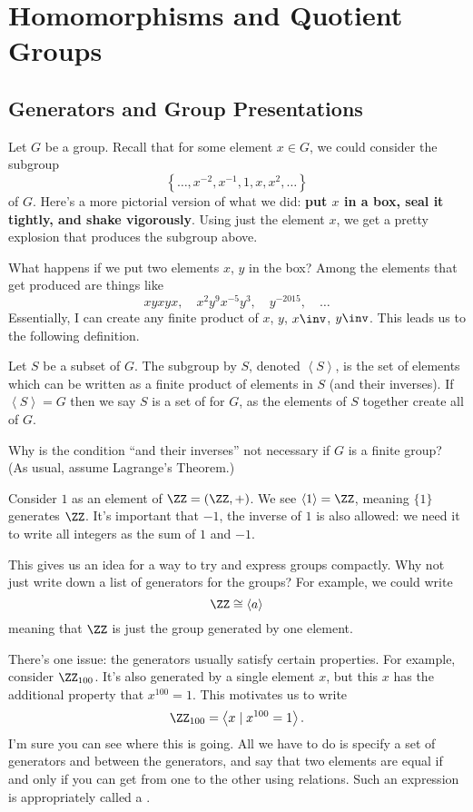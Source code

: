 \chapter{Homomorphisms and Quotient Groups}
\section{Generators and Group Presentations}
Let $G$ be a group. Recall that for some element $x \in G$, we could consider the subgroup
\[ \left\{ \dots, x^{-2}, x^{-1}, 1, x, x^2, \dots \right\} \]
of $G$.
Here's a more pictorial version of what we did: \textbf{put $x$ in a box, seal it tightly, and shake vigorously}.
Using just the element $x$, we get a pretty explosion that produces the subgroup above.

What happens if we put two elements $x$, $y$ in the box?
Among the elements that get produced are things like
\[ xyxyx, \quad x^2y^9x^{-5}y^3, \quad y^{-2015}, \quad \dots\]
Essentially, I can create any finite product of $x$, $y$, $x\inv$, $y\inv$.
This leads us to the following definition.
\begin{definition}
	Let $S$ be a subset of $G$.  The subgroup  by $S$, denoted $\left<S\right>$, is the set of elements which can be written as a finite product of elements in $S$ (and their inverses).
	If $\left<S\right> = G$ then we say $S$ is a set of  for $G$,
	as the elements of $S$ together create all of $G$.
\end{definition}
\begin{exercise}
	Why is the condition ``and their inverses''
	not necessary if $G$ is  a finite group?
	(As usual, assume Lagrange's Theorem.)
\end{exercise}

\begin{example}
	Consider $1$ as an element of $\ZZ = (\ZZ, +)$.
	We see $\left<1\right> = \ZZ$, meaning $\{1\}$ generates $\ZZ$.
	It's important that $-1$, the inverse of $1$ is also allowed:
	we need it to write all integers as the sum of $1$ and $-1$.
\end{example}

This gives us an idea for a way to try and express groups compactly.
Why not just write down a list of generators for the groups?
For example, we could write
\[ \ZZ \cong \left< a \right> \]
meaning that $\ZZ$ is just the group generated by one element.

There's one issue: the generators usually satisfy certain properties.
For example, consider $\Zc{100}$.
It's also generated by a single element $x$, but this $x$ has the additional property that $x^{100} = 1$.
This motivates us to write
\[ \Zc{100} = \left< x \mid x^{100} = 1 \right>. \]
I'm sure you can see where this is going.
All we have to do is specify a set of generators and  between the generators, and say that two elements are equal if and only if you can get from one to the other using relations.
Such an expression is appropriately called a .

